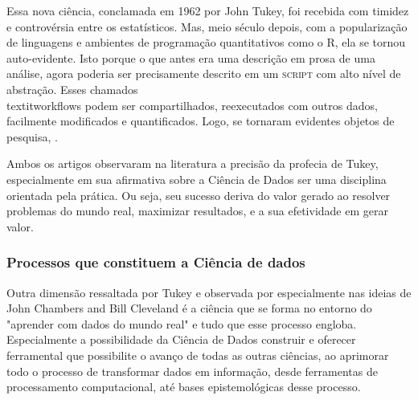 Essa nova ciência, conclamada em 1962 por John Tukey, foi recebida com timidez e controvérsia entre os estatísticos. Mas, meio século depois, com a popularização de linguagens e ambientes de programação quantitativos como o R\cite{ihaka1996r},  ela se tornou auto-evidente. Isto porque o que antes era uma descrição em prosa de uma análise, agora poderia ser precisamente descrito em um \textsc{script} com alto nível de abstração. Esses chamados \\textit{workflows} podem ser compartilhados, reexecutados com outros dados, facilmente modificados e quantificados. Logo, se tornaram evidentes objetos de pesquisa, \cite{DONOHO}.

Ambos os artigos \cite{BATON,DONOHO} observaram na literatura a precisão da profecia de Tukey, especialmente em sua afirmativa sobre a Ciência de Dados ser uma disciplina orientada pela prática. Ou seja, seu sucesso deriva do valor gerado ao resolver problemas do mundo real, maximizar resultados, e a sua efetividade em gerar valor. 

\subsubsection{Processos que constituem a Ciência de dados}
Outra dimensão ressaltada por Tukey e observada por \cite{DONOHO} especialmente nas ideias de John Chambers\cite{CHAMBERS} and Bill Cleveland\cite{cleveland2001data} é a ciência que se forma no entorno do "aprender com dados do mundo real" e tudo que esse processo engloba. Especialmente a possibilidade da Ciência de Dados construir e oferecer ferramental que possibilite o avanço de todas as outras ciências, ao aprimorar todo o processo de transformar dados em informação, desde ferramentas de processamento computacional, até bases epistemológicas desse processo. 

